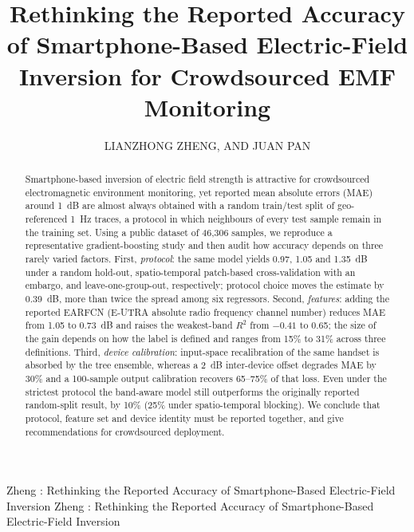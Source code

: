 \documentclass{ieeeaccess}
\begin{document}

\title{Rethinking the Reported Accuracy of Smartphone-Based Electric-Field Inversion for Crowdsourced EMF Monitoring}

\author{\uppercase{Lianzhong Zheng},
\uppercase{and Juan Pan}}

\address[1]{China Academy of Information and Communications Technology, Beijing 100191, China (e-mail: zlz347661070@gmail.com, panjuan@caict.ac.cn).}


\markboth
{Zheng \headeretal: Rethinking the Reported Accuracy of Smartphone-Based Electric-Field Inversion}
{Zheng \headeretal: Rethinking the Reported Accuracy of Smartphone-Based Electric-Field Inversion}


\begin{abstract}
Smartphone-based inversion of electric field strength is attractive for
crowdsourced electromagnetic environment monitoring, yet reported mean absolute
errors (MAE) around 1~dB are almost always obtained with a random train/test split
of geo-referenced 1~Hz traces, a protocol in which neighbours of every test sample
remain in the training set. Using a public dataset of 46{,}306 samples, we
reproduce a representative gradient-boosting study and then audit how accuracy
depends on three rarely varied factors. First, \emph{protocol}: the same model
yields 0.97, 1.05 and 1.35~dB under a random hold-out, spatio-temporal patch-based
cross-validation with an embargo, and leave-one-group-out, respectively;
protocol choice moves the estimate by 0.39~dB, more than twice the spread among
six regressors. Second, \emph{features}: adding the reported EARFCN (E-UTRA absolute radio frequency channel number)
reduces MAE from 1.05 to 0.73~dB and raises the weakest-band $R^2$ from $-0.41$
to 0.65; the size of the gain depends on how the label is defined and ranges
from 15\% to 31\% across three definitions.
Third, \emph{device calibration}: input-space recalibration of the same handset
is absorbed by the tree ensemble, whereas a 2~dB inter-device offset degrades MAE
by 30\% and a 100-sample output calibration recovers 65--75\% of that loss.
Even under the strictest protocol the band-aware model still outperforms the
originally reported random-split result, by 10\% (25\% under spatio-temporal
blocking). We conclude that protocol, feature set and
device identity must be reported together, and give recommendations for
crowdsourced deployment.
\end{abstract}
\end{document}
